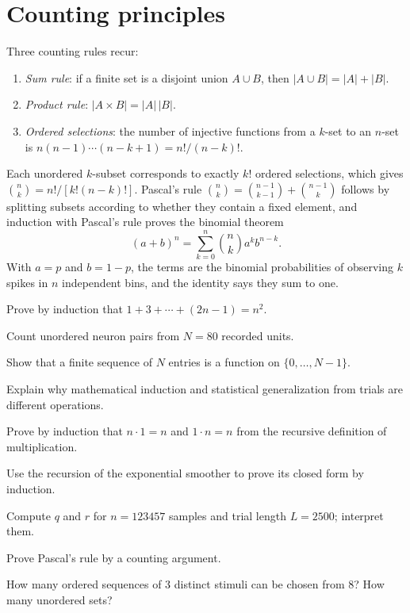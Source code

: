 \section{Counting principles}
Three counting rules recur:
\begin{enumerate}[leftmargin=2em]
\item \emph{Sum rule}: if a finite set is a disjoint union $A\cup B$, then $|A\cup B|=|A|+|B|$.
\item \emph{Product rule}: $|A\times B|=|A|\,|B|$.
\item \emph{Ordered selections}: the number of injective functions from a $k$-set to an $n$-set is $n(n-1)\cdots(n-k+1)=n!/(n-k)!$.
\end{enumerate}
Each unordered $k$-subset corresponds to exactly $k!$ ordered selections, which gives $\binom nk=n!/[k!(n-k)!]$. Pascal's rule $\binom nk=\binom{n-1}{k-1}+\binom{n-1}{k}$ follows by splitting subsets according to whether they contain a fixed element, and induction with Pascal's rule proves the binomial theorem
\[
(a+b)^n=\sum_{k=0}^n\binom nk a^kb^{n-k}.
\]
With $a=p$ and $b=1-p$, the terms are the binomial probabilities of observing $k$ spikes in $n$ independent bins, and the identity says they sum to one.
\begin{exercises}
\item Prove by induction that $1+3+\cdots+(2n-1)=n^2$.
\item Count unordered neuron pairs from $N=80$ recorded units.
\item Show that a finite sequence of $N$ entries is a function on $\{0,\ldots,N-1\}$.
\item Explain why mathematical induction and statistical generalization from trials are different operations.
\item Prove by induction that $n\cdot1=n$ and $1\cdot n=n$ from the recursive definition of multiplication.
\item Use the recursion of the exponential smoother to prove its closed form by induction.
\item Compute $q$ and $r$ for $n=123457$ samples and trial length $L=2500$; interpret them.
\item Prove Pascal's rule by a counting argument.
\item How many ordered sequences of 3 distinct stimuli can be chosen from 8? How many unordered sets?
\end{exercises}
